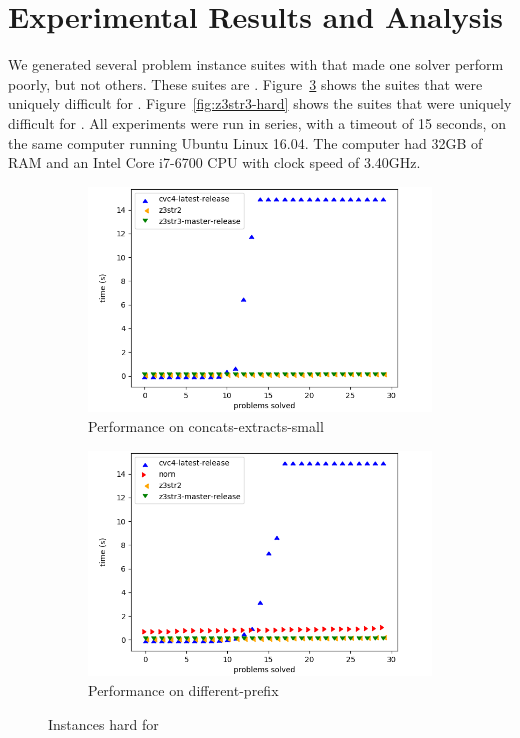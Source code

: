 \section{Experimental Results and Analysis}
\label{sec:data}

We generated several problem instance suites with \fuzzer{} that made one
solver perform poorly, but not others. These suites are
\theSuites{}. Figure~\ref{fig:cvc-hard} shows the suites that were
uniquely difficult for \cvc{}. Figure~\ref{fig:z3str3-hard} shows the
suites that were uniquely difficult for \us{}. All experiments were
run in series, with a timeout of 15 seconds, on the same computer running
Ubuntu Linux 16.04. The computer had 32GB of RAM and an
Intel\textregistered{} Core\texttrademark{} i7-6700 CPU with clock speed
of 3.40GHz.

\begin{figure}[h]
    \begin{subfigure}{.5\textwidth}
        \includegraphics[width=\textwidth]{data/graphs/concats-extracts-small.png}
        \caption{Performance on concats-extracts-small}
        \label{fig:concats-extracts-small}
    \end{subfigure}
    \begin{subfigure}{.5\textwidth}
        \includegraphics[width=\textwidth]{data/graphs/different-prefix.png}
        \caption{Performance on different-prefix}
        \label{fig:different-prefix}
    \end{subfigure}
    \caption{Instances hard for \cvc{}}
    \label{fig:cvc-hard}


\end{figure}
